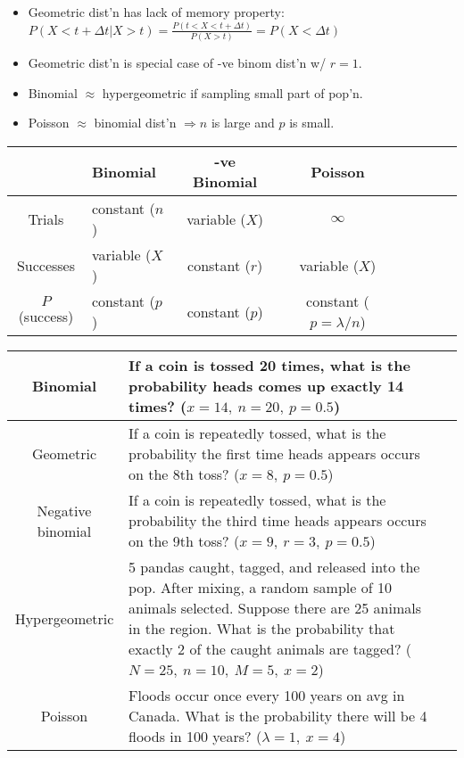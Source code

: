 \documentclass[twocolumn]{article}
\begin{document}
\begin{minipage}[t]{.48\textwidth}
    \vspace{-3em}
    \begin{itemize}
        \item Geometric dist'n has lack of memory property:
        \subitem $P(X < t + \Delta t | X > t) = \frac{P(t < X < t + \Delta t)}{P(X > t)} = P(X < \Delta t)$
        \item Geometric dist'n is special case of -ve binom dist'n w/ $r=1$.
        \item Binomial $\approx$ hypergeometric if sampling small part of pop'n.
        \item Poisson $\approx$ binomial dist'n $\Longrightarrow n$ is large and $p$ is small.
    \end{itemize}
\end{minipage}
\hfill
\begin{minipage}[t]{.5\textwidth}
    \flushright
    \begin{tabular}{Sl | Sc Sc Sc}
        \toprule
        & Binomial & -ve Binomial & Poisson \\
        \hline
        Trials & constant ($n$) & variable ($X$) & $\infty$ \\
        Successes & variable ($X$) & constant ($r$) & variable ($X$) \\
        $P$(success) & constant ($p$) & constant ($p$) & constant ($p = \lambda/n$) \\
        \bottomrule
    \end{tabular}
\end{minipage}

\begin{table}[ht]
    \centering
    \begin{tabular}{ Sl S{p{0.69\textwidth}} }
        \toprule
        Binomial & If a coin is tossed 20 times, what is the probability heads comes up exactly 14 times? ($x=14,\ n=20,\ p=0.5$) \\
        \midrule
        Geometric & If a coin is repeatedly tossed, what is the probability the first time heads appears occurs on the 8th toss? ($x=8,\ p=0.5$) \\
        \midrule
        Negative binomial & If a coin is repeatedly tossed, what is the probability the third time heads appears occurs on the 9th toss? ($x=9,\ r=3,\ p=0.5$) \\
        \midrule
        Hypergeometric & 5 pandas caught, tagged, and released into the pop. After mixing, a random sample of 10 animals selected. Suppose there are 25 animals in the region. What is the probability that exactly 2 of the caught animals are tagged? ($N=25,\ n=10,\ M=5,\ x=2$) \\
        \midrule
        Poisson & Floods occur once every 100 years on avg in Canada. What is the probability there will be 4 floods in 100 years? ($\lambda = 1,\ x = 4$) \\
        \bottomrule
    \end{tabular}
\end{table}
\end{document}
